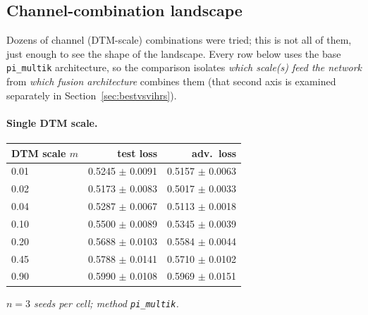 \documentclass[11pt]{article}
\begin{document}
\subsection{Channel-combination landscape}
\label{sec:landscape}

Dozens of channel (DTM-scale) combinations were tried; this is not all of them,
just enough to see the shape of the landscape. Every row below uses the base
\texttt{pi\_multik} architecture, so the comparison isolates \emph{which
scale(s) feed the network} from \emph{which fusion architecture} combines them
(that second axis is examined separately in Section~\ref{sec:bestvsvihrs}).

\paragraph{Single DTM scale.}
\begin{center}
\begin{tabular}{@{}lrr@{}}
\toprule
\textbf{DTM scale $m$} & \textbf{test loss} & \textbf{adv.\ loss} \\
\midrule
0.01 & 0.5245 $\pm$ 0.0091 & 0.5157 $\pm$ 0.0063 \\
0.02 & 0.5173 $\pm$ 0.0083 & 0.5017 $\pm$ 0.0033 \\
0.04 & 0.5287 $\pm$ 0.0067 & 0.5113 $\pm$ 0.0018 \\
0.10 & 0.5500 $\pm$ 0.0089 & 0.5345 $\pm$ 0.0039 \\
0.20 & 0.5688 $\pm$ 0.0103 & 0.5584 $\pm$ 0.0044 \\
0.45 & 0.5788 $\pm$ 0.0141 & 0.5710 $\pm$ 0.0102 \\
0.90 & 0.5990 $\pm$ 0.0108 & 0.5969 $\pm$ 0.0151 \\
\bottomrule
\end{tabular}
\end{center}
\emph{$n=3$ seeds per cell; method \texttt{pi\_multik}.}
\end{document}
